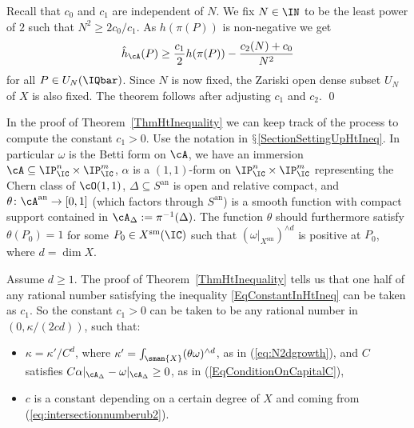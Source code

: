 Recall that $c_0$ and $c_1$ are independent of $N$. We  fix $N\in\IN$ to be the least
power of $2$ such that $N^2\ge 2c_0/c_1$. As $h(\pi(P))$ is
non-negative we get  %
\[
\hat{h}_{\cA}(P) \ge \frac{c_1}{2} h(\pi(P)) - \frac{c_2(N)+ c_0}{N^2}
\]
for all
$P \in U_N(\IQbar)$. Since $N$ is now fixed, the Zariski open dense
subset $U_N$ of $X$ is also fixed.
The theorem follows after adjusting $c_1$ and $c_2$.
\qed
\begin{remark}
\notready
In the proof of Theorem~\ref{ThmHtInequality} we can keep track of the
process to compute the constant $c_1 > 0$. Use the notation in
$\mathsection$\ref{SectionSettingUpHtIneq}. In particular $\omega$ is
the Betti form on $\cA$, we have an immersion $\cA \subseteq \IP_\IC^n
\times \IP_\IC^m$, $\alpha$ is a $(1,1)$-form on $\IP_\IC^n \times
\IP_\IC^m$ representing the Chern class of $\cO(1,1)$, $\Delta \subseteq S^{\mathrm{an}}$ is open and relative compact, and $\theta \colon \cA^{\mathrm{an}} \rightarrow [0,1]$ (which factors through $S^{\mathrm{an}}$) is a smooth function with compact support contained in $\cA_{\Delta} := \pi^{-1}(\Delta)$. The function $\theta$ should furthermore satisfy $\theta(P_0) = 1$ for some $P_0 \in X^{\mathrm{sm}}(\IC)$ such that $(\omega|_{X^{\mathrm{sm}}})^{\wedge d}$ is positive at $P_0$, where $d = \dim X$.

Assume $d \ge 1$. The proof of Theorem~\ref{ThmHtInequality} tells us
that one half of any rational number satisfying the inequality
\eqref{EqConstantInHtIneq} can be taken as $c_1$. So the constant $c_1 > 0$ can be taken to be any rational
number
in  $(0,\kappa/(2c d))$, such that: %
\begin{itemize}
\item $\kappa = \kappa'/C^d$, where $\kappa' = \int_{\sman{X}}(
  \theta\omega )^{\wedge d}$, as in (\ref{eq:N2dgrowth}), and $C$ satisfies $C
  \alpha|_{\cA_{\Delta}} - \omega|_{\cA_{\Delta}} \ge 0$, as in (\ref{EqConditionOnCapitalC}),
\item $c$ is a  constant depending on a certain degree of  $X$ and coming from
  (\ref{eq:intersectionnumberub2}). %
\end{itemize}
\end{remark}



